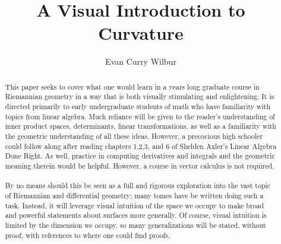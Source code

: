 \documentclass[]{article}
\title{A Visual Introduction to Curvature}
\author{Evan Curry Wilbur}
\newcommand\<{\ensuremath{\left\langle}}
\renewcommand\>{\ensuremath{\right\rangle}}
\theoremstyle{definition}
\theoremstyle{definition}
\begin{document}
	\maketitle
	\begin{abstract}
		\indent
		This paper seeks to cover what one would learn in a years long graduate course in Riemannian geometry in a way that is both visually stimulating and enlightening. It is directed primarily to early undergraduate students of math who have familiarity with topics from linear algebra. Much reliance will be given to the reader's understanding of inner product spaces, determinants, linear transformations, as well as a familiarity with the geometric understanding of all these ideas. However, a precocious high schooler could follow along after reading chapters 1,2,3, and 6 of Shelden Axler's Linear Algebra Done Right. As well, practice in computing derivatives and integrals and the geometric meaning therein would be helpful. However, a course in vector calculus is not required.
		\\
		\\
		\indent
		By no means should this be seen as a full and rigorous exploration into the vast topic of Riemannian and differential geometry; many tomes have be written doing such a task. Instead, it will leverage visual intuition of the space we occupy to make broad and powerful statements about surfaces more generally. Of course, visual intuition is limited by the dimension we occupy, so many generalizations will be stated, without proof, with references to where one could find proofs.
	\end{abstract}
	
\end{document}
